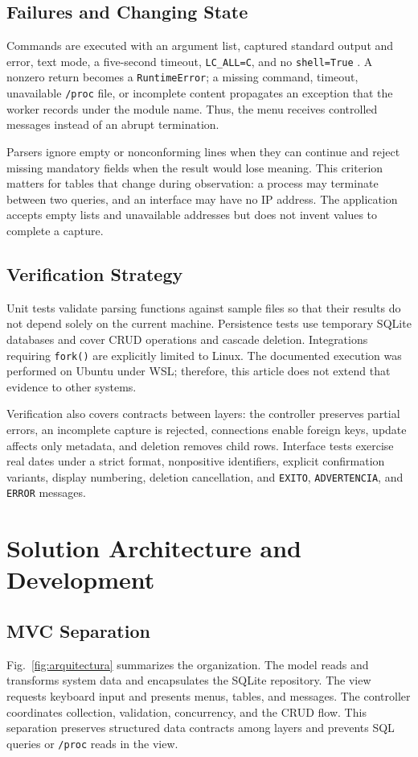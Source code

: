 \documentclass[conference]{IEEEtran}
\begin{document}
\subsection{Failures and Changing State}
Commands are executed with an argument list, captured standard output and error, text mode, a five-second timeout, \texttt{LC\_ALL=C}, and no \texttt{shell=True} \cite{pythonsubprocess}. A nonzero return becomes a \texttt{RuntimeError}; a missing command, timeout, unavailable \texttt{/proc} file, or incomplete content propagates an exception that the worker records under the module name. Thus, the menu receives controlled messages instead of an abrupt termination.

Parsers ignore empty or nonconforming lines when they can continue and reject missing mandatory fields when the result would lose meaning. This criterion matters for tables that change during observation: a process may terminate between two queries, and an interface may have no IP address. The application accepts empty lists and unavailable addresses but does not invent values to complete a capture.

\subsection{Verification Strategy}
Unit tests validate parsing functions against sample files so that their results do not depend solely on the current machine. Persistence tests use temporary SQLite databases and cover CRUD operations and cascade deletion. Integrations requiring \texttt{fork()} are explicitly limited to Linux. The documented execution was performed on Ubuntu under WSL; therefore, this article does not extend that evidence to other systems.

Verification also covers contracts between layers: the controller preserves partial errors, an incomplete capture is rejected, connections enable foreign keys, update affects only metadata, and deletion removes child rows. Interface tests exercise real dates under a strict format, nonpositive identifiers, explicit confirmation variants, display numbering, deletion cancellation, and \texttt{EXITO}, \texttt{ADVERTENCIA}, and \texttt{ERROR} messages.

\section{Solution Architecture and Development}
\subsection{MVC Separation}
Fig.~\ref{fig:arquitectura} summarizes the organization. The model reads and transforms system data and encapsulates the SQLite repository. The view requests keyboard input and presents menus, tables, and messages. The controller coordinates collection, validation, concurrency, and the CRUD flow. This separation preserves structured data contracts among layers and prevents SQL queries or \texttt{/proc} reads in the view.
\end{document}
